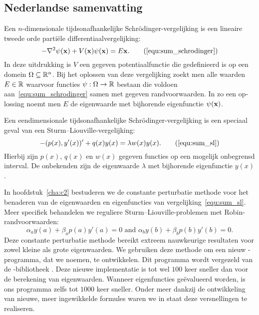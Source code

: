 \begin{otherlanguage}{dutch}
\section*{Nederlandse samenvatting}

Een $n$-dimensionale tijdsonafhankelijke Schrödinger-vergelijking is een lineaire tweede orde partiële differentiaalvergelijking:
\begin{equation}
-\nabla^2 \psi(\vb{x}) + V(\vb{x}) \psi(\vb{x}) = E\vb{x}\text{.} \tag{\ref{equ:sum_schrodinger}}
\end{equation}
In deze uitdrukking is $V$ een gegeven potentiaalfunctie die gedefinieerd is op een domein $\Omega \subseteq \mathbb{R}^n$. Bij het oplossen van deze vergelijking zoekt men alle waarden $E\in \mathbb{R}$ waarvoor functies $\psi : \Omega \to \mathbb{R}$ bestaan die voldoen aan~\eqref{equ:sum_schrodinger} samen met gegeven randvoorwaarden. In zo een oplossing noemt men $E$ de eigenwaarde met bijhorende eigenfunctie $\psi(\vb{x})$.

Een eendimensionale tijdsonafhankelijke Schrödinger-vergelijking is een speciaal geval van een Sturm--Liouville-vergelijking:
\begin{equation}
    -(p(x), y'(x))' + q(x) y(x) = \lambda w(x) y(x) \text{.} \tag{\ref{equ:sum_sl}}
\end{equation}
Hierbij zijn $p(x)$, $q(x)$ en $w(x)$ gegeven functies op een mogelijk onbegrensd interval. De onbekenden zijn de eigenwaarde $\lambda$ met bijhorende eigenfunctie $y(x)$.

In hoofdstuk~\ref{cha:c2} bestuderen we de constante perturbatie methode voor het benaderen van de eigenwaarden en eigenfuncties van vergelijking~\eqref{equ:sum_sl}. Meer specifiek behandelen we reguliere Sturm--Liouville-problemen met Robin-randvoorwaarden:
$$
\alpha_a y(a) + \beta_a p(a) y'(a) = 0 \text{ and } \alpha_b y(b) + \beta_b p(b) y'(b) = 0\text{.}
$$
Deze constante perturbatie methode bereikt extreem nauwkeurige resultaten voor zowel kleine als grote eigenwaarden. We gebruiken deze methode om een nieuw \cpp{}-programma, dat we  noemen, te ontwikkelen. Dit programma wordt vergezeld van de \lpython{}-bibliotheek \pyslise{}. Deze nieuwe implementatie is tot wel $100$ keer sneller dan  voor de berekening van eigenwaarden. Wanneer eigenfuncties geëvalueerd worden, is ons programma zelfs tot $1000$ keer sneller. Onder meer dankzij de ontwikkeling van nieuwe, meer ingewikkelde formules waren we in staat deze versnellingen te realiseren. 


\end{otherlanguage}
